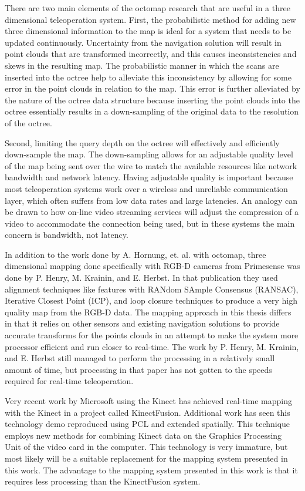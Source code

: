 \documentclass[12pt]{report}
\begin{document}
There are two main elements of the octomap research that are useful in a three dimensional teleoperation system.  First, the probabilistic method for adding new three dimensional information to the map is ideal for a system that needs to be updated continuously.  Uncertainty from the navigation solution will result in point clouds that are transformed incorrectly, and this causes inconsistencies and skews in the resulting map. The probabilistic manner in which the scans are inserted into the octree help to alleviate this inconsistency by allowing for some error in the point clouds in relation to the map. This error is further alleviated by the nature of the octree data structure because inserting the point clouds into the octree essentially results in a down-sampling of the original data to the resolution of the octree.

Second, limiting the query depth on the octree will effectively and efficiently down-sample the map.  The down-sampling allows for an adjustable quality level of the map being sent over the wire to match the available resources like network bandwidth and network latency.  Having adjustable quality is important because most teleoperation systems work over a wireless and unreliable communication layer, which often suffers from low data rates and large latencies.  An analogy can be drawn to how on-line video streaming services will adjust the compression of a video to accommodate the connection being used, but in these systems the main concern is bandwidth, not latency.

In addition to the work done by A. Hornung, et. al. with octomap, three dimensional mapping done specifically with RGB-D cameras from Primesense was done by P. Henry, M. Krainin, and E. Herbst\cite{Henry2010}.  In that publication they used alignment techniques like features with RANdom SAmple Consensus (RANSAC), Iterative Closest Point (ICP), and loop closure techniques to produce a very high quality map from the RGB-D data\cite{Henry2010}.  The mapping approach in this thesis differs in that it relies on other sensors and existing navigation solutions to provide accurate transforms for the points clouds in an attempt to make the system more processor efficient and run closer to real-time.  The work by P. Henry, M. Krainin, and E. Herbst still managed to perform the processing in a relatively small amount of time, but processing in that paper has not gotten to the speeds required for real-time teleoperation.

Very recent work by Microsoft using the Kinect has achieved real-time mapping with the Kinect in a project called KinectFusion\cite{izadi2011kinectfusion}.  Additional work has seen this technology demo reproduced using PCL and extended spatially\cite{whelankintinuous}.  This technique employs new methods for combining Kinect data on the Graphics Processing Unit of the video card in the computer.  This technology is very immature, but most likely will be a suitable replacement for the mapping system presented in this work.  The advantage to the mapping system presented in this work is that it requires less processing than the KinectFusion system.
\end{document}
